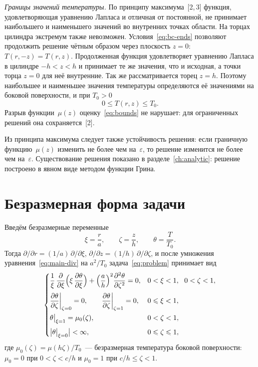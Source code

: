 \emph{Границы значений температуры.} По принципу максимума~[2,\,3] функция,
удовлетворяющая уравнению Лапласа и отличная от постоянной, не принимает
наибольшего и наименьшего значений во внутренних точках области. На торцах
цилиндра экстремум также невозможен. Условия~\eqref{eq:bc-ends} позволяют
продолжить решение чётным образом через плоскость $z=0$:
$T(r,-z)=T(r,z)$. Продолженная функция удовлетворяет уравнению Лапласа
в цилиндре $-h<z<h$ и принимает те же значения, что и исходная, а точки
торца $z=0$ для неё внутренние. Так же рассматривается торец $z=h$. Поэтому
наибольшее и наименьшее значения температуры определяются её значениями на
боковой поверхности, и при $T_0>0$
\begin{equation}
\label{eq:bounds}
0\le T(r,z)\le T_0 .
\end{equation}
Разрыв функции~$\mu(z)$ оценку~\eqref{eq:bounds} не нарушает: для
ограниченных решений она сохраняется~[2].

Из принципа максимума следует также устойчивость решения: если граничную
функцию~$\mu(z)$ изменить не более чем на~$\varepsilon$, то решение
изменится не более чем на~$\varepsilon$. Существование решения
показано в разделе~\ref{ch:analytic}: решение построено в явном виде
методом функции Грина.

\section{Безразмерная форма задачи}
\label{sec:dimless}

Введём безразмерные переменные
\begin{equation}
\label{eq:dimless-vars}
\xi=\frac{r}{a},\qquad \zeta=\frac{z}{h},\qquad \theta=\frac{T}{T_0} .
\end{equation}
Тогда $\partial/\partial r=(1/a)\,\partial/\partial\xi$,
$\partial/\partial z=(1/h)\,\partial/\partial\zeta$, и после умножения
уравнения~\eqref{eq:main-div} на $a^2/T_0$ задача~\eqref{eq:problem}
принимает вид
\begin{equation}
\label{eq:dimless}
\begin{cases}
\dfrac{1}{\xi}\,\pd{}{\xi}\Bigl(\xi\,\pd{\theta}{\xi}\Bigr)
+\Bigl(\dfrac{a}{h}\Bigr)^{2}\pdd{\theta}{\zeta}=0,
  & 0<\xi<1,\ \ 0<\zeta<1,\\[10pt]
\pd{\theta}{\zeta}\bigg|_{\zeta=0}=0,\qquad
\pd{\theta}{\zeta}\bigg|_{\zeta=1}=0,
  & 0\le\xi<1,\\[10pt]
\theta\big|_{\xi=1}=\mu_0(\zeta),
  & 0<\zeta<1,\\[6pt]
\bigl|\theta\big|_{\xi=0}\bigr|<\infty,
  & 0\le\zeta\le 1,
\end{cases}
\postdisplaypenalty=10000
\end{equation}
где $\mu_0(\zeta)=\mu(h\zeta)/T_0$~— безразмерная температура боковой
поверхности: $\mu_0=0$ при \mbox{$0<\zeta<c/h$} и $\mu_0=1$ при
\mbox{$c/h\le\zeta<1$}.

